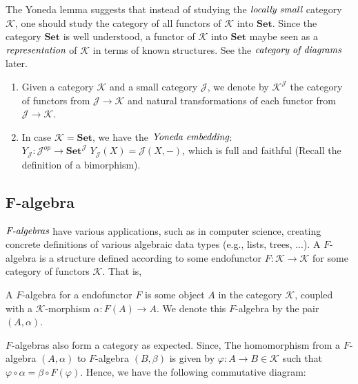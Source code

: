 \begin{defn}
The Yoneda lemma suggests that instead of studying the $\emph{locally small}$ category $\mathcal{K}$,
one should study the category of all functors of $\mathcal{K}$ into $\textbf{Set}$.
Since the category $\textbf{Set}$ is well understood, a functor of $\mathcal{K}$ into $\textbf{Set}$
maybe seen as a $\emph{representation}$ of $\mathcal{K}$ in terms of known structures.
See the $\emph{category of diagrams}$ later.
 \begin{enumerate}
  \item Given a category $\mathcal{K}$ and a small category $\mathcal{J}$, we denote by
  $\mathcal{K}^\mathcal{J}$ the category of functors from $\mathcal{J} \to \mathcal{K}$ and natural transformations
  of each functor from $\mathcal{J} \to \mathcal{K}$.
  \item In case $\mathcal{K} = \textbf{Set}$, we have the $\emph{Yoneda embedding}$:\\
  $Y_{\mathcal{J}}: \mathcal{J}^{op} \to \textbf{Set}^{\mathcal{J}}
  \, \,
  Y_{\mathcal{J}}(X) = \mathcal{J}(X, -)$, which is full and faithful (Recall the definition of a bimorphism).
 \end{enumerate}
\end{defn}


\subsection{F-algebra} %
\label{subsec:f-algebra}
$\emph{F-algebras}$ have various applications, such as in computer science,
creating concrete definitions of various algebraic data types (e.g., lists, trees, ...).
A $F$-algebra is a structure defined according to some endofunctor $F: \mathcal{K} \to \mathcal{K}$
for some category of functors $\mathcal{K}$. That is,

\begin{defn}[F-algebra]
 A $F$-algebra for a endofunctor $F$ is some object $A$ in the category $\mathcal{K}$, coupled with
 a $\mathcal{K}$-morphism $\alpha: F(A) \to A$. We denote this $F$-algebra by the pair $(A, \alpha)$.
\end{defn}

$F$-algebras also form a category as expected.
Since, The homomorphism from a $F$-algebra $(A, \alpha)$ to $F$-algebra $(B, \beta)$
is given by $\varphi: A \to B \in \mathcal{K}$ such that $\varphi \circ \alpha = \beta \circ F(\varphi)$.
Hence, we have the following commutative diagram:

